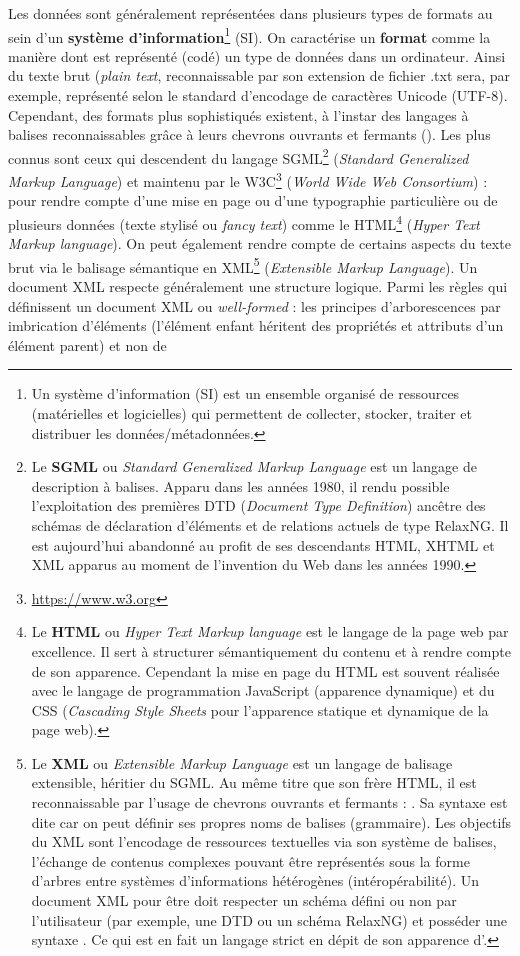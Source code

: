 Les données sont généralement représentées dans plusieurs types de formats au sein d'un \textbf{système d'information}\footnote{Un système d'information (SI) est un ensemble organisé de ressources (matérielles et logicielles) qui permettent de collecter, stocker, traiter et distribuer les données/métadonnées.} (SI). On caractérise un \textbf{format} comme la manière dont est représenté (codé) un type de données dans un ordinateur. Ainsi du texte brut (\textit{plain text}, reconnaissable par son extension de fichier .txt sera, par exemple, représenté selon le standard d'encodage de caractères Unicode (UTF-8). Cependant, des formats plus sophistiqués existent, à l'instar des langages à balises reconnaissables grâce à leurs chevrons ouvrants et fermants (\citecode{< >}). Les plus connus sont ceux qui descendent du langage SGML\footnote{Le \textbf{SGML} ou \textit{Standard Generalized Markup Language} est un langage de description à balises. Apparu dans les années 1980, il rendu possible l'exploitation des premières DTD (\textit{Document Type Definition}) ancêtre des schémas de déclaration d'éléments et de relations actuels de type RelaxNG. Il est aujourd'hui abandonné au profit de ses descendants HTML, XHTML et XML apparus au moment de l'invention du Web dans les années 1990.} (\textit{Standard Generalized Markup Language}) et maintenu par le W3C\footnote{\url{https://www.w3.org}} (\textit{World Wide Web Consortium}) : pour rendre compte d'une mise en page ou d'une typographie particulière ou de plusieurs données (texte stylisé ou \textit{fancy text}) comme le HTML\footnote{Le \textbf{HTML} ou \textit{Hyper Text Markup language} est le langage de la page web par excellence. Il sert à structurer sémantiquement du contenu et à rendre compte de son apparence. Cependant la mise en page du HTML est souvent réalisée avec le langage de programmation JavaScript (apparence dynamique) et du CSS (\textit{Cascading Style Sheets} pour l'apparence statique et dynamique de la page web).} (\textit{Hyper Text Markup language}). On peut également rendre compte de certains aspects du texte brut via le balisage sémantique en XML\footnote{Le \textbf{XML} ou \textit{Extensible Markup Language} est un langage de balisage extensible, héritier du SGML. Au même titre que son frère HTML, il est reconnaissable par l'usage de chevrons ouvrants et fermants : \citecode{< >}. Sa syntaxe est dite  car on peut définir ses propres noms de balises (grammaire). Les objectifs du XML sont l'encodage de ressources textuelles via son système de balises, l'échange de contenus complexes pouvant être représentés sous la forme d'arbres entre systèmes d'informations hétérogènes (intéropérabilité). Un document XML pour être  doit respecter un schéma défini ou non par l'utilisateur (par exemple, une DTD ou un schéma RelaxNG) et posséder une syntaxe . Ce qui est en fait un langage strict en dépit de son apparence d'.} (\textit{Extensible Markup Language}). Un document XML respecte généralement une structure logique. Parmi les règles qui définissent un document XML  ou \textit{well-formed} : les principes d'arborescences par imbrication d'éléments (l'élément enfant héritent des propriétés et attributs d'un élément parent) et non de 